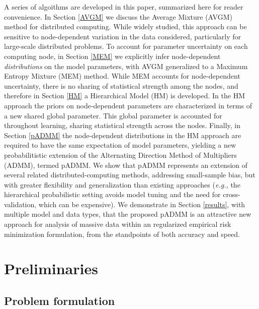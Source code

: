 \documentclass{article}
\newcommand{\eg}[0]{\emph{e.g., }}
\newcommand{\1}[0]{\ensuremath{\boldsymbol{1}}\xspace}
\begin{document}
A series of algoithms are developed in this paper, summarized here for reader convenience. In Section \ref{AVGM} we discuss the Average Mixture (AVGM) method for distributed computing. While widely studied, this approach can be sensitive to node-dependent variation in the data considered, particularly for large-scale distributed problems. To account for parameter uncertainty on each computing node, in Section \ref{MEM} we explicitly infer node-dependent \emph{distributions} on the model parameters, with AVGM generalized to a Maximum Entropy Mixture (MEM) method. While MEM accounts for node-dependent uncertainty, there is no sharing of statistical strength among the nodes, and therefore in Section \ref{HM} a Hierarchical Model (HM) is developed. In the HM approach the priors on node-dependent parameters are characterized in terms of a new shared global parameter. This global parameter is accounted for throughout learning, sharing statistical strength across the nodes. Finally, in Section \ref{pADMM} the node-dependent distributions in the HM approach are required to have the same expectation of model parameters, yielding a new probabilitistic extension of the Alternating Direction Method of Multipliers (ADMM), termed pADMM. We show that pADMM represents an extension of several related distributed-computing methods, addressing small-sample bias, but with greater flexibility and generalization than existing approaches (\eg the hierarchical probabilistic setting avoids model tuning and the need for cross-validation, which can be expensive). We demonstrate in Section \ref{results}, with multiple model and data types, that the proposed pADMM is an attractive new approach for analysis of massive data within an regularized empirical risk minimization formulation, from the standpoints of both accuracy and speed.


\section{Preliminaries}
\subsection{Problem formulation}\label{problem_formulation}
\end{document}
